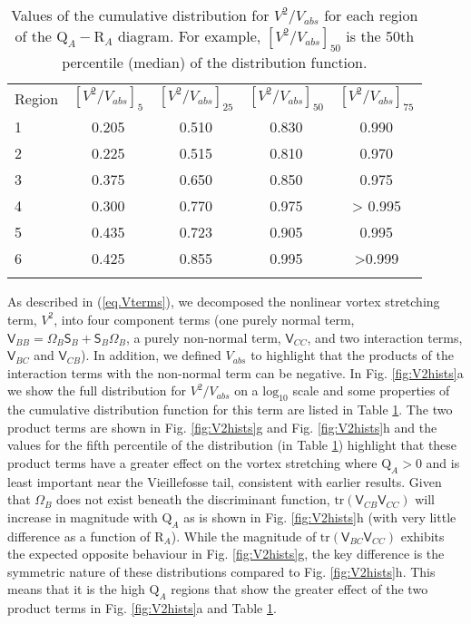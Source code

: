 \documentclass[preprint,amssymb,amsmath,aip,cha]{revtex4-1}
\begin{document}
\begin{table}
\caption{Values of the cumulative distribution for $V^{2} / V_{abs}$ for each region of the $\mbox{Q}_{A}-\mbox{R}_{A}$ diagram. For example, $[V^{2} / V_{abs}]_{50}$ is the 50th percentile (median) of the distribution function.}
\centering
\begin{tabular}{lcccc}
\noalign{\smallskip}
Region & $[V^{2} / V_{abs}]_{5}$ & $[V^{2} / V_{abs}]_{25}$ & $[V^{2} / V_{abs}]_{50}$ & $[V^{2} / V_{abs}]_{75}$\\
\noalign{\smallskip}%
1 & 0.205 & 0.510 & 0.830 & 0.990\\
2 & 0.225 & 0.515 & 0.810 & 0.970 \\
3 & 0.375 &  0.650 & 0.850 & 0.975\\
4 & 0.300 & 0.770 & 0.975 & > 0.995\\
5 & 0.435 & 0.723 &  0.905 & 0.995\\
6 & 0.425 & 0.855 & 0.995 & >0.999\\
\noalign{\smallskip}%
\label{table.V2}
\end{tabular}
\end{table}

As described in (\ref{eq.Vterms}), we decomposed the nonlinear vortex stretching term, $V^{2}$, into four component terms (one purely normal term, $\mathsf{V}_{BB} = \mathsf{\Omega}_{B}\mathsf{S}_{B} + \mathsf{S}_{B}\mathsf{\Omega}_{B}$, a purely non-normal term, $\mathsf{V}_{CC}$, and two interaction terms, $\mathsf{V}_{BC}$ and $\mathsf{V}_{CB}$). In addition, we defined $V_{abs}$ to highlight that the products of the interaction terms with the non-normal term can be negative. In Fig. \ref{fig:V2hists}a we show the full distribution for $V^{2}/V_{abs}$ on a $\mbox{log}_{10}$ scale and some properties of the cumulative distribution function for this term are listed in Table \ref{table.V2}. The two product terms are shown in Fig. \ref{fig:V2hists}g and Fig. \ref{fig:V2hists}h and the values for the fifth percentile of the distribution (in Table \ref{table.V2}) highlight that these product terms have a greater effect on the vortex stretching where $\mbox{Q}_{A} > 0$ and is least important near the Vieillefosse tail, consistent with earlier results. Given that $\mathsf{\Omega}_B$ does not exist beneath the discriminant function, $\mbox{tr}(\mathsf{V}_{CB}\mathsf{V}_{CC})$ will increase in magnitude with $\mbox{Q}_{A}$ as is shown in Fig. \ref{fig:V2hists}h (with very little difference as a function of $\mbox{R}_{A}$). While the magnitude of $\mbox{tr}(\mathsf{V}_{BC}\mathsf{V}_{CC})$ exhibits the expected opposite behaviour in Fig. \ref{fig:V2hists}g, the key difference is the symmetric nature of these distributions compared to Fig. \ref{fig:V2hists}h. This means that it is the high $\mbox{Q}_{A}$ regions that show the greater effect of the two product terms in Fig. \ref{fig:V2hists}a and Table \ref{table.V2}. 
\end{document}
